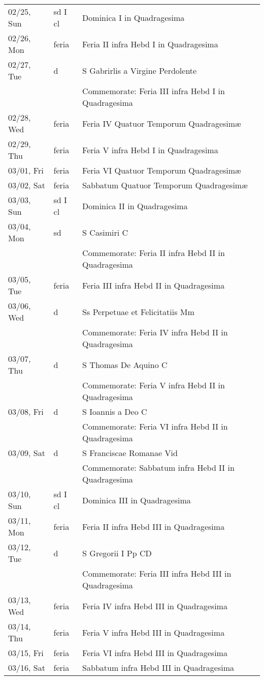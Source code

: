 \documentclass{article}
\begin{document}
\begin{longtable}{ l l l }
02/25, Sun & sd I cl & Dominica I in Quadragesima\\
02/26, Mon & feria & Feria II infra Hebd I in Quadragesima\\
02/27, Tue & d & S Gabrirlis a Virgine Perdolente\\
 & & Commemorate: Feria III infra Hebd I in Quadragesima\\
02/28, Wed & feria & Feria IV Quatuor Temporum Quadragesimæ\\
02/29, Thu & feria & Feria V infra Hebd I in Quadragesima\\
03/01, Fri & feria & Feria VI Quatuor Temporum Quadragesimæ\\
03/02, Sat & feria & Sabbatum Quatuor Temporum Quadragesimæ\\
03/03, Sun & sd I cl & Dominica II in Quadragesima\\
03/04, Mon & sd & S Casimiri C\\
 & & Commemorate: Feria II infra Hebd II in Quadragesima\\
03/05, Tue & feria & Feria III infra Hebd II in Quadragesima\\
03/06, Wed & d & Ss Perpetuae et Felicitatiis Mm\\
 & & Commemorate: Feria IV infra Hebd II in Quadragesima\\
03/07, Thu & d & S Thomas De Aquino C\\
 & & Commemorate: Feria V infra Hebd II in Quadragesima\\
03/08, Fri & d & S Ioannis a Deo C\\
 & & Commemorate: Feria VI infra Hebd II in Quadragesima\\
03/09, Sat & d & S Franciscae Romanae Vid\\
 & & Commemorate: Sabbatum infra Hebd II in Quadragesima\\
03/10, Sun & sd I cl & Dominica III in Quadragesima\\
03/11, Mon & feria & Feria II infra Hebd III in Quadragesima\\
03/12, Tue & d & S Gregorii I Pp CD\\
 & & Commemorate: Feria III infra Hebd III in Quadragesima\\
03/13, Wed & feria & Feria IV infra Hebd III in Quadragesima\\
03/14, Thu & feria & Feria V infra Hebd III in Quadragesima\\
03/15, Fri & feria & Feria VI infra Hebd III in Quadragesima\\
03/16, Sat & feria & Sabbatum infra Hebd III in Quadragesima\\

\end{longtable}
\end{document}
